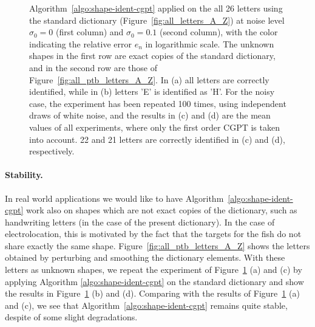 \begin{figure}[htp]
  \caption{Algorithm~\ref{algo:shape-ident-cgpt} applied on the all 26
    letters using the standard dictionary
    (Figure~\ref{fig:all_letters_A_Z}) at noise level $\sigma_0=0$
    (first column) and $\sigma_0=0.1$ (second column), with the color
    indicating the relative error $e_n$ in logarithmic scale. The
    unknown shapes in the first row are exact copies of the standard
    dictionary, and in the second row are those of
    Figure~\ref{fig:all_ptb_letters_A_Z}. In (a) all letters are
    correctly identified, while in (b) letters 'E' is identified as
    'H'. For the noisy case, the experiment has been repeated 100
    times, using independent draws of white noise, and the results in
    (c) and (d) are the mean values of all experiments, where only the
    first order CGPT is taken into account. 22 and 21 letters
    are correctly identified in (c) and (d), respectively.}
  \label{fig:matching_all_letters}
\end{figure}

\paragraph{Stability.}
In real world applications we would like to have
Algorithm~\ref{algo:shape-ident-cgpt} work also on shapes which
are not exact copies of the dictionary, such as handwriting
letters (in the case of the present dictionary). In the case of
electrolocation, this is motivated by the fact that the targets for the
fish do not share exactly the same shape.
Figure~\ref{fig:all_ptb_letters_A_Z} shows the letters
obtained by perturbing and smoothing the dictionary elements. With
these letters as unknown shapes, we repeat the experiment of
Figure~\ref{fig:matching_all_letters} (a) and (c) by applying
Algorithm \ref{algo:shape-ident-cgpt} on the standard dictionary
and show the results in Figure~\ref{fig:matching_all_letters} (b)
and (d). Comparing with the results of
Figure~\ref{fig:matching_all_letters} (a) and (c), we see that
Algorithm~\ref{algo:shape-ident-cgpt} remains quite stable,
despite of some slight degradations.

